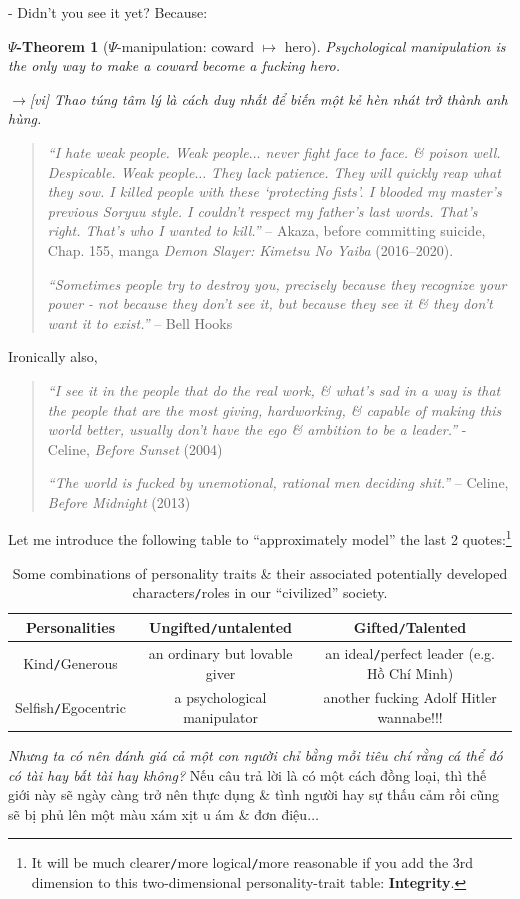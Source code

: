 \documentclass[12pt,oneside]{book}
\newtheorem{psy-theorem}{$\Psi$-Theorem}
\begin{document}
- Didn't you see it yet? Because:
\begin{psy-theorem}[$\Psi$-manipulation: coward $\mapsto$ hero]
	Psychological manipulation is the only way to make a coward become a fucking hero.
	
	{\sf[en]$\to$[vi]} Thao túng tâm lý là cách duy nhất để biến một kẻ hèn nhát trở thành anh hùng.
\end{psy-theorem}

\begin{quotation}
	{\it``I hate weak people. Weak people$\ldots$ never fight face to face. \& poison well. Despicable. Weak people$\ldots$ They lack patience. They will quickly reap what they sow. I killed people with these `protecting fists'. I blooded my master's previous Soryuu style. I couldn't respect my father's last words. That's right. That's who I wanted to kill.''} -- {\sf Akaza}, before committing suicide, Chap. 155, manga {\it Demon Slayer: Kimetsu No Yaiba} (2016--2020).
	
	{\it``Sometimes people try to destroy you, precisely because they recognize your power - not because they don't see it, but because they see it \& they don't want it to exist.''} -- {\sc Bell Hooks}
\end{quotation}
Ironically also,

\begin{quotation}
	{\it``I see it in the people that do the real work, \& what's sad in a way is that the people that are the most giving, hardworking, \& capable of making this world better, usually don't have the ego \& ambition to be a leader.''} - {\sf Celine}, {\it Before Sunset} (2004)
	
	{\it``The world is fucked by unemotional, rational men deciding shit.''} -- {\sf Celine}, {\it Before Midnight} (2013)
\end{quotation}
Let me introduce the following table to ``approximately model'' the last 2 quotes:\footnote{It will be much clearer{\tt/}more logical{\tt/}more reasonable if you add the 3rd dimension to this two-dimensional personality-trait table: {\bf Integrity}.}

\begin{table}[h]
	\centering
	\begin{tabular}{|c|c|c|}
		\hline
		 Personalities & Ungifted{\tt/}untalented & Gifted{\tt/}Talented \\
		\hline
		Kind{\tt/}Generous & an ordinary but lovable giver & an ideal{\tt/}perfect leader (e.g. Hồ Chí Minh) \\
		\hline
		Selfish{\tt/}Egocentric & a psychological manipulator & another fucking Adolf Hitler wannabe!!! \\
		\hline
	\end{tabular}
	\caption{Some combinations of personality traits \& their associated potentially developed characters{\tt/}roles in our ``civilized'' society.}
\end{table}
{\it Nhưng ta có nên đánh giá cả một con người chỉ bằng mỗi tiêu chí rằng cá thể đó có tài hay bất tài hay không?} Nếu câu trả lời là có một cách đồng loại, thì thế giới này sẽ ngày càng trở nên thực dụng \& tình người hay sự thấu cảm rồi cũng sẽ bị phủ lên một màu xám xịt u ám \& đơn điệu$\ldots$
\end{document}
